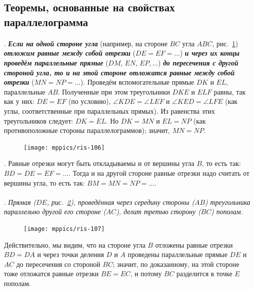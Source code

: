 \documentclass[twoside]{book}
\begin{document}
\subsection*{Теоремы, основанные на свойствах параллелограмма}

\paragraph{}\label{1938/95}
.
\textbf{\emph{Если на одной стороне угла}} (например, на стороне $BC$ угла $ABC$, рис.~\ref{1938/ris-106}) \textbf{\emph{отложим равные между собой отрезки}} ($DE=EF=\dots$) \textbf{\emph{и через их концы проведём параллельные прямые}} ($DM$, $EN$, $EP,\dots$) \textbf{\emph{до пересечения с другой стороной угла, то и на этой стороне отложатся равные между собой отрезки}} ($MN=NP=\dots$).
Проведём вспомогательные прямые $DK$ и $EL$, параллельные $AB$.
Полученные при этом треугольники $DKE$ и $ELF$ равны, так как у них:
$DE=EF$ (по условию), $\angle KDE=\angle LEF$ и $\angle KED = \angle LFE$ (как углы, соответственные при параллельных прямых).
Из равенства этих треугольников следует:
$DK=EL$.
Но $DK=MN$ и $EL=NP$ (как противоположные стороны параллелограммов);
значит, $MN=NP$.

\begin{figure}[h!]
\centering
\texttt{[image: mppics/ris-106]}
\caption{}\label{1938/ris-106}
\end{figure}

\smallskip
{}.
Равные отрезки могут быть откладываемы и от вершины угла $B$, то есть
так:
$BD=DE= EF=\dots$.
Тогда и на другой стороне равные отрезки надо считать от вершины угла, то есть так:
$BM=MN=NP=\dots$.

\paragraph{}\label{1938/96}
\mbox{.}
\emph{Прямая \emph{($DE$, рис.~\ref{1938/ris-107}),} проведённая через середину стороны ($AB$) треугольника параллельно другой его стороне ($AC$), делит третью сторону ($BC$) пополам.}

\begin{figure}
\centering
\texttt{[image: mppics/ris-107]}
\caption{}\label{1938/ris-107}
\end{figure}


Действительно, мы видим, что на стороне угла $B$ отложены равные отрезки $BD=DA$ и через точки деления $D$ и $A$ проведены параллельные прямые $DE$ и $AC$ до пересечения со стороной $BC$;
значит, по доказанному, на этой стороне тоже отложатся равные отрезки $BE=EC$, и потому $BC$ разделится в точке $E$ пополам.
\end{document}
